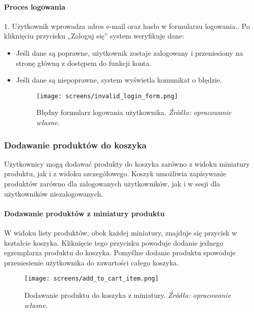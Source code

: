\documentclass[12pt,a4paper,oneside]{article}
\theoremstyle{definition}
\numberwithin{equation}{section}
\begin{document}
\paragraph{Proces logowania}
1. Użytkownik wprowadza adres e-mail oraz hasło w formularzu logowania.. Po kliknięciu przycisku „Zaloguj się” system weryfikuje dane:
   \begin{itemize}
       \item Jeśli dane są poprawne, użytkownik zostaje zalogowany i przeniesiony na stronę główną z dostępem do funkcji konta.
       \item Jeśli dane są niepoprawne, system wyświetla komunikat o błędzie.
       \begin{figure}[H]
        \centering
        \texttt{[image: screens/invalid\_login\_form.png]}
        \caption{Błędny formularz logowania użytkownika. \emph{Źródło: opracowanie własne.}}
        \label{fig:invalid_login_form}
    \end{figure}
   \end{itemize}






\newpage
   \subsubsection{Dodawanie produktów do koszyka}
   Użytkownicy mogą dodawać produkty do koszyka zarówno z widoku miniatury produktu, jak i z widoku szczegółowego. Koszyk umożliwia zapisywanie produktów zarówno dla zalogowanych użytkowników, jak i w sesji dla użytkowników niezalogowanych.
   
   \paragraph{Dodawanie produktów z miniatury produktu}
   W widoku listy produktów, obok każdej miniatury, znajduje się przycisk w kształcie koszyka. Kliknięcie tego przycisku powoduje dodanie jednego egzemplarza produktu do koszyka. Pomyślne dodanie produktu spowoduje przeniesienie użytkownika do zawartości całego koszyka.
      
   \begin{figure}[H]
    \centering
    \texttt{[image: screens/add\_to\_cart\_item.png]}
    \caption{Dodawanie produktu do koszyka z miniatury. \emph{Źródło: opracowanie własne.}}
    \label{fig:add_to_cart_miniature}
\end{figure}
\end{document}
